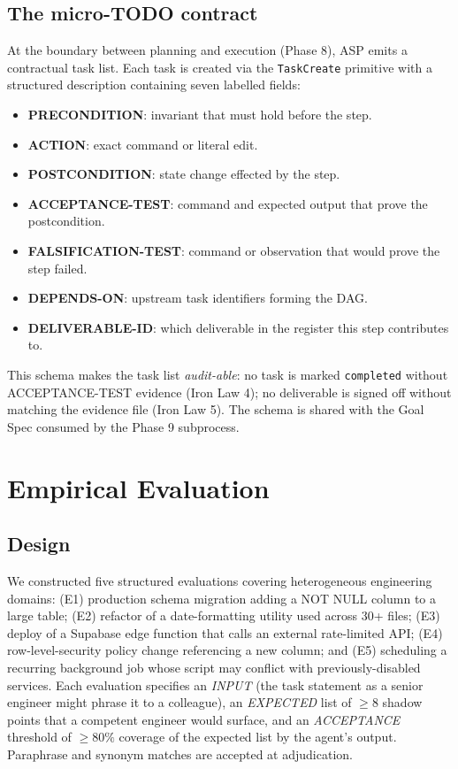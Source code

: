 \documentclass[11pt, a4paper]{article}
\begin{document}
\subsection{The micro-TODO contract}
At the boundary between planning and execution (Phase 8), ASP emits a contractual task list. Each task is created via the \texttt{TaskCreate} primitive with a structured description containing seven labelled fields:
\begin{itemize}[leftmargin=*]
  \item \textbf{PRECONDITION}: invariant that must hold before the step.
  \item \textbf{ACTION}: exact command or literal edit.
  \item \textbf{POSTCONDITION}: state change effected by the step.
  \item \textbf{ACCEPTANCE-TEST}: command and expected output that prove the postcondition.
  \item \textbf{FALSIFICATION-TEST}: command or observation that would prove the step failed.
  \item \textbf{DEPENDS-ON}: upstream task identifiers forming the DAG.
  \item \textbf{DELIVERABLE-ID}: which deliverable in the register this step contributes to.
\end{itemize}
This schema makes the task list \emph{audit-able}: no task is marked \texttt{completed} without ACCEPTANCE-TEST evidence (Iron Law 4); no deliverable is signed off without matching the evidence file (Iron Law 5). The schema is shared with the Goal Spec consumed by the Phase 9 subprocess.

\section{Empirical Evaluation}
\label{sec:eval}

\subsection{Design}
We constructed five structured evaluations covering heterogeneous engineering domains: (E1) production schema migration adding a NOT NULL column to a large table; (E2) refactor of a date-formatting utility used across 30+ files; (E3) deploy of a Supabase edge function that calls an external rate-limited API; (E4) row-level-security policy change referencing a new column; and (E5) scheduling a recurring background job whose script may conflict with previously-disabled services. Each evaluation specifies an \emph{INPUT} (the task statement as a senior engineer might phrase it to a colleague), an \emph{EXPECTED} list of $\geq 8$ shadow points that a competent engineer would surface, and an \emph{ACCEPTANCE} threshold of $\geq 80\%$ coverage of the expected list by the agent's output. Paraphrase and synonym matches are accepted at adjudication.
\end{document}
